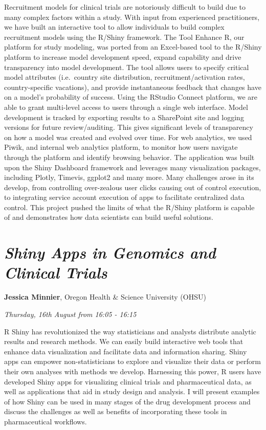 \documentclass[]{book}
\theoremstyle{definition}
\theoremstyle{definition}
\theoremstyle{definition}
\theoremstyle{remark}
\begin{document}
Recruitment models for clinical trials are notoriously difficult to
build due to many complex factors within a study. With input from
experienced practitioners, we have built an interactive tool to allow
individuals to build complex recruitment models using the R/Shiny
framework. The Tool Enhance R, our platform for study modeling, was
ported from an Excel-based tool to the R/Shiny platform to increase
model development speed, expand capability and drive transparency into
model development. The tool allows users to specify critical model
attributes (i.e.~country site distribution, recruitment/activation
rates, country-specific vacations), and provide instantaneous feedback
that changes have on a model's probability of success. Using the RStudio
Connect platform, we are able to grant multi-level access to users
through a single web interface. Model development is tracked by
exporting results to a SharePoint site and logging versions for future
review/auditing. This gives significant levels of transparency on how a
model was created and evolved over time. For web analytics, we used
Piwik, and internal web analytics platform, to monitor how users
navigate through the platform and identify browsing behavior. The
application was built upon the Shiny Dashboard framework and leverages
many visualization packages, including Plotly, Timevis, ggplot2 and many
more. Many challenges arose in its develop, from controlling
over-zealous user clicks causing out of control execution, to
integrating service account execution of apps to facilitate centralized
data control. This project pushed the limits of what the R/Shiny
platform is capable of and demonstrates how data scientists can build
useful solutions.

\hypertarget{shiny-apps-in-genomics-and-clinical-trials}{%
\section{\texorpdfstring{\emph{Shiny Apps in Genomics and Clinical
Trials}}{Shiny Apps in Genomics and Clinical Trials}}\label{shiny-apps-in-genomics-and-clinical-trials}}

\textbf{Jessica Minnier}, Oregon Health \& Science University (OHSU)

\emph{Thursday, 16th August from 16:05 - 16:15}

R Shiny has revolutionized the way statisticians and analysts distribute
analytic results and research methods. We can easily build interactive
web tools that enhance data visualization and facilitate data and
information sharing. Shiny apps can empower non-statisticians to explore
and visualize their data or perform their own analyses with methods we
develop. Harnessing this power, R users have developed Shiny apps for
visualizing clinical trials and pharmaceutical data, as well as
applications that aid in study design and analysis. I will present
examples of how Shiny can be used in many stages of the drug development
process and discuss the challenges as well as benefits of incorporating
these tools in pharmaceutical workflows.
\end{document}
